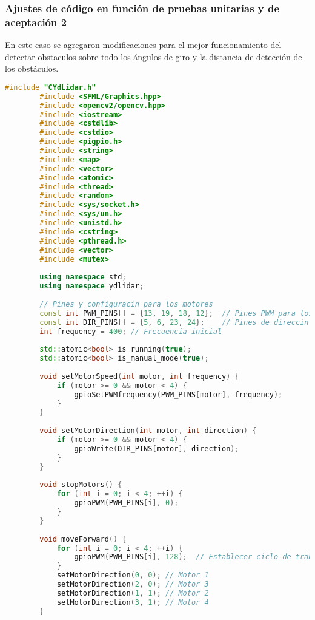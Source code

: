 \subsubsection{Ajustes de c\'odigo en funci\'on de pruebas unitarias y de aceptaci\'on 2} %
\label{ssub:Ajustes de c\'odigo en funci\'on de pruebas unitarias y de aceptaci\'on}
    En este caso se agregaron modificaciones para el mejor funcionamiento del detectar obstaculos
    sobre todo los \'angulos de giro y la distancia de detecci\'on de los obst\'aculos.
    \begin{lstlisting}[language={C++}, caption={Primer ajuste de c\'odigo}, label={Script}]
        #include "CYdLidar.h"
        #include <SFML/Graphics.hpp>
        #include <opencv2/opencv.hpp>
        #include <iostream>
        #include <cstdlib>
        #include <cstdio>
        #include <pigpio.h>
        #include <string>
        #include <map>
        #include <vector>
        #include <atomic>
        #include <thread>
        #include <random>
        #include <sys/socket.h>
        #include <sys/un.h>
        #include <unistd.h>
        #include <cstring>
        #include <pthread.h>
        #include <vector>
        #include <mutex>
        
        using namespace std;
        using namespace ydlidar;
        
        // Pines y configuracin para los motores
        const int PWM_PINS[] = {13, 19, 18, 12};  // Pines PWM para los motores
        const int DIR_PINS[] = {5, 6, 23, 24};    // Pines de direccin para los motores
        int frequency = 400; // Frecuencia inicial
        
        std::atomic<bool> is_running(true);
        std::atomic<bool> is_manual_mode(true);
        
        void setMotorSpeed(int motor, int frequency) {
            if (motor >= 0 && motor < 4) {
                gpioSetPWMfrequency(PWM_PINS[motor], frequency);
            }
        }
        
        void setMotorDirection(int motor, int direction) {
            if (motor >= 0 && motor < 4) {
                gpioWrite(DIR_PINS[motor], direction);
            }
        }
        
        void stopMotors() {
            for (int i = 0; i < 4; ++i) {
                gpioPWM(PWM_PINS[i], 0);
            }
        }
        
        void moveForward() {
            for (int i = 0; i < 4; ++i) {
                gpioPWM(PWM_PINS[i], 128);  // Establecer ciclo de trabajo al 50%
            }
            setMotorDirection(0, 0); // Motor 1
            setMotorDirection(2, 0); // Motor 3
            setMotorDirection(1, 1); // Motor 2
            setMotorDirection(3, 1); // Motor 4
        }
        

\end{lstlisting}
